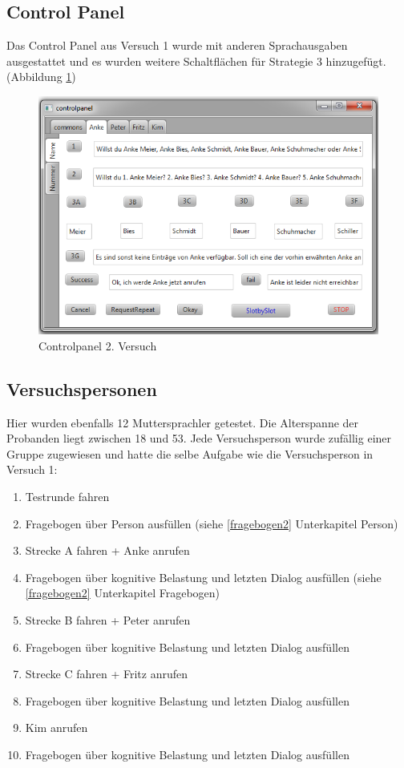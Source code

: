 \documentclass[12pt,a4paper]{scrartcl}
\begin{document}
\subsection{Control Panel}
Das Control Panel aus Versuch 1 wurde mit anderen Sprachausgaben ausgestattet und es wurden weitere Schaltflächen für Strategie 3 hinzugefügt. (Abbildung \ref{cp2})
\begin{figure}[H]
\includegraphics[width=13cm]{controlpanel2.png}
\caption{Controlpanel 2. Versuch}
\label{cp2}
\end{figure}


\subsection{Versuchspersonen}

Hier wurden ebenfalls 12 Muttersprachler getestet. Die Alterspanne der Probanden liegt zwischen 18 und 53. Jede Versuchsperson wurde zufällig einer Gruppe zugewiesen und hatte die selbe Aufgabe wie die Versuchsperson in Versuch 1: 
\begin{enumerate}
\item Testrunde fahren
\item Fragebogen über Person ausfüllen (siehe \ref{fragebogen2} Unterkapitel Person)
\item Strecke A fahren + Anke anrufen
\item Fragebogen über kognitive Belastung und letzten Dialog ausfüllen (siehe \ref{fragebogen2} Unterkapitel Fragebogen)
\item Strecke B fahren + Peter anrufen
\item Fragebogen über kognitive Belastung und letzten Dialog ausfüllen
\item Strecke C fahren + Fritz anrufen
\item Fragebogen über kognitive Belastung und letzten Dialog ausfüllen 
\item Kim anrufen
\item Fragebogen über kognitive Belastung und letzten Dialog ausfüllen 
\end{enumerate}
\end{document}

